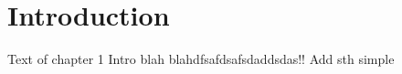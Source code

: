 \chapter{Introduction} \label{chapter:introduction}
Text of chapter 1 Intro blah blahdfsafdsafsdaddsdas!!
Add sth simple